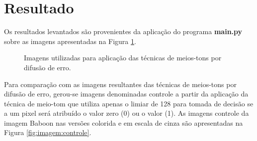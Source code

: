 \documentclass{article}
\begin{document}
%
\section{Resultado}
Os resultados levantados são provenientes da aplicação do programa \textbf{main.py} sobre as imagens apresentadas na Figura \ref{fig:imagem:entrada}. 

\begin{figure}[!htp]%
	\centering
	\qquad
	\caption{Imagens utilizadas para aplicação das técnicas de meios-tons por difusão de erro.}%
	\label{fig:imagem:entrada}%
\end{figure}

Para comparação com as imagens resultantes das técnicas de meios-tons por difusão de erro, gerou-se imagens denominadas controle a partir da aplicação da técnica de meio-tom que utiliza apenas o limiar de 128 para tomada de decisão se a um pixel será atribuído o valor zero (0) ou o valor (1). As imagens controle da imagem Baboon nas versões colorida e em escala de cinza são apresentadas na Figura \ref{fig:imagem:controle}.
\end{document}

